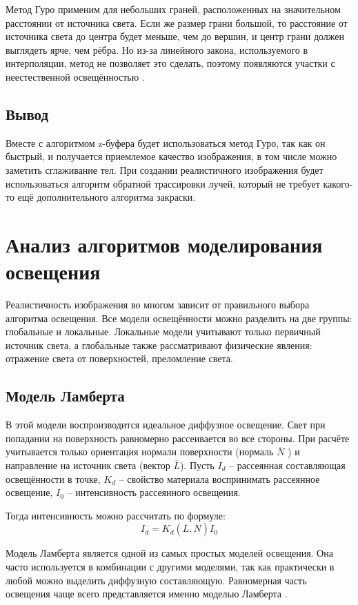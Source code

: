 Метод Гуро применим для небольших граней, расположенных на значительном расстоянии от источника света. 
Если же размер грани большой, то расстояние от источника света до центра будет меньше, чем до вершин, и центр грани должен выглядеть ярче, чем рёбра.
Но из-за линейного закона, используемого в интерполяции, метод не позволяет это сделать, поэтому появляются участки с неестественной освещённостью \cite{rojers}.

\subsection{Вывод}
Вместе с алгоритмом z-буфера будет использоваться метод Гуро, так как он быстрый, и получается приемлемое качество изображения, в том числе можно заметить сглаживание тел. 
При создании реалистичного изображения будет использоваться алгоритм обратной трассировки лучей, который не требует какого-то ещё дополнительного алгоритма закраски.

\section{Анализ алгоритмов моделирования освещения}
Реалистичность изображения во многом зависит от правильного выбора алгоритма освещения. 
Все модели освещённости можно разделить на две группы: глобальные и локальные. 
Локальные модели учитывают только первичный источник света, а глобальные также рассматривают физические явления: 
отражение света от поверхностей, преломление света.

\subsection{Модель Ламберта}
В этой модели воспроизводится идеальное диффузное освещение. \cite{cul}
Свет при попадании на поверхность равномерно рассеивается во все стороны. 
При расчёте учитывается только ориентация нормали поверхности (нормаль $\overline{N}$ ) и направление на источник света (вектор $\overline{L}$).
Пусть $I_d$ – рассеянная составляющая освещённости в точке, $K_d$ – свойство материала воспринимать рассеянное освещение, 
$I_0$ – интенсивность рассеянного освещения. 

Тогда интенсивность можно рассчитать по формуле:
\begin{equation}
I_d = K_d(\overline{L}, \overline{N})I_0
\end{equation}

Модель Ламберта является одной из самых простых моделей освещения. Она часто используется в комбинации с другими моделями, так как практически в любой можно выделить диффузную составляющую. Равномерная часть освещения чаще всего представляется именно моделью Ламберта \cite{light}.

